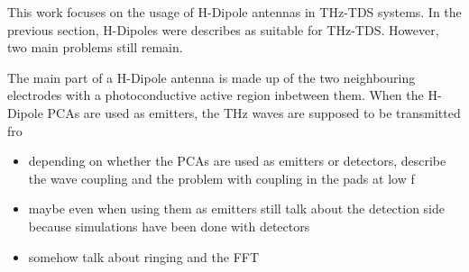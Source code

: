 This work focuses on the usage of H-Dipole antennas in THz-TDS systems. In the previous section, H-Dipoles were describes as suitable for THz-TDS. However, two main problems still remain. 

The main part of a H-Dipole antenna is made up of the two neighbouring electrodes with a photoconductive active region inbetween them. When the H-Dipole PCAs are used as emitters, the THz waves are supposed to be transmitted fro
\begin{itemize}
    \item depending on whether the PCAs are used as emitters or detectors, describe the wave coupling and the problem with coupling in the pads at low f 
    \item maybe even when using them as emitters still talk about the detection side because simulations have been done with detectors 
    \item somehow talk about ringing and the FFT 
\end{itemize}